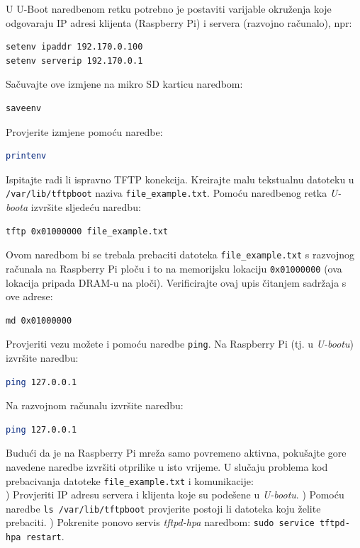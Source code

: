 \documentclass[11pt]{article}
\begin{document}
U U-Boot naredbenom retku potrebno je postaviti varijable okruženja koje
 odgovaraju IP adresi klijenta (Raspberry Pi) i servera (razvojno računalo),
 npr:
\begin{lstlisting}[language=bash]
setenv ipaddr 192.170.0.100
setenv serverip 192.170.0.1
\end{lstlisting}
Sačuvajte ove izmjene na mikro SD karticu naredbom:
\begin{lstlisting}[language=bash]
saveenv
\end{lstlisting}
Provjerite izmjene pomoću naredbe:
\begin{lstlisting}[language=bash]
printenv
\end{lstlisting}
Ispitajte radi li ispravno TFTP konekcija. Kreirajte malu tekstualnu datoteku u
 \texttt{/var/lib/tftpboot} naziva \texttt{file\_example.txt}. Pomoću
 naredbenog retka \textit{U-boota} izvršite sljedeću naredbu:
\begin{lstlisting}[language=bash]
tftp 0x01000000 file_example.txt
\end{lstlisting}
Ovom naredbom bi se trebala prebaciti datoteka \texttt{file\_example.txt} s
 razvojnog računala na Raspberry Pi ploču i to na memorijsku lokaciju
 \texttt{0x01000000} (ova lokacija pripada DRAM-u na ploči). Verificirajte ovaj
 upis čitanjem sadržaja s ove adrese:
\begin{lstlisting}[language=bash]
md 0x01000000
\end{lstlisting}
Provjeriti vezu možete i pomoću naredbe \texttt{ping}. Na Raspberry Pi (tj. u
 \textit{U-bootu}) izvršite naredbu:
\begin{lstlisting}[language=bash]
ping 127.0.0.1
\end{lstlisting}
Na razvojnom računalu izvršite naredbu:
\begin{lstlisting}[language=bash]
ping 127.0.0.1
\end{lstlisting}
Budući da je na Raspberry Pi mreža samo povremeno aktivna, pokušajte gore
 navedene naredbe izvršiti otprilike u isto vrijeme.
 U slučaju problema kod prebacivanja datoteke \texttt{file\_example.txt} i
 komunikacije: \\
) Provjeriti IP adresu servera i klijenta koje su podešene u \textit{U-bootu}.
) Pomoću naredbe \texttt{ls /var/lib/tftpboot} provjerite postoji li datoteka
 koju želite prebaciti.
) Pokrenite ponovo servis \textit{tftpd-hpa} naredbom: \texttt{sudo service
 tftpd-hpa restart}.
\end{document}
